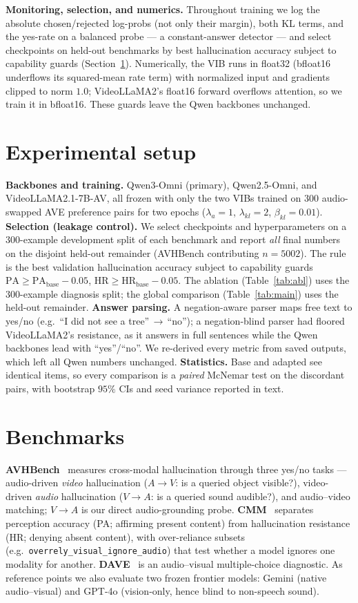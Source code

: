 \documentclass{article}
\begin{document}
\textbf{Monitoring, selection, and numerics.} Throughout training we log the absolute chosen/rejected
log-probs (not only their margin), both KL terms, and the yes-rate on a balanced probe --- a
constant-answer detector --- and select checkpoints on held-out benchmarks by best hallucination accuracy
subject to capability guards (Section~\ref{sec:setup}). Numerically, the VIB runs in float32 (bfloat16
underflows its squared-mean rate term) with normalized input and gradients clipped to norm $1.0$;
VideoLLaMA2's float16 forward overflows attention, so we train it in bfloat16. These guards leave the Qwen
backbones unchanged.

\section{Experimental setup}
\label{sec:setup}
\textbf{Backbones and training.} Qwen3-Omni (primary), Qwen2.5-Omni, and VideoLLaMA2.1-7B-AV, all frozen
with only the two VIBs trained on $300$ audio-swapped AVE preference pairs for two epochs
($\lambda_a{=}1$, $\lambda_{kl}{=}2$, $\beta_{kl}{=}0.01$). \textbf{Selection (leakage control).} We select
checkpoints and hyperparameters on a $300$-example development split of each benchmark and report \emph{all}
final numbers on the disjoint held-out remainder (AVHBench contributing $n{=}5002$). The rule is the best
validation hallucination accuracy subject to capability guards
$\text{PA}\ge\text{PA}_{\text{base}}-0.05$, $\text{HR}\ge\text{HR}_{\text{base}}-0.05$. The ablation
(Table~\ref{tab:abl}) uses the $300$-example diagnosis split; the global comparison
(Table~\ref{tab:main}) uses the held-out remainder. \textbf{Answer parsing.} A negation-aware parser maps
free text to yes/no (e.g.\ ``I did not see a tree''$\,\to\,$``no''); a negation-blind parser had floored
VideoLLaMA2's resistance, as it answers in full sentences while the Qwen backbones lead with
``yes''/``no''. We re-derived every metric from saved outputs, which left all Qwen numbers unchanged.
\textbf{Statistics.} Base and adapted see identical items, so every comparison is a \emph{paired} McNemar
test on the discordant pairs, with bootstrap $95\%$ CIs and seed variance reported in text.

\section{Benchmarks}
\label{sec:bench}
\textbf{AVHBench}~\cite{avhbench} measures cross-modal hallucination through three yes/no tasks ---
audio-driven \emph{video} hallucination ($A\!\to\!V$: is a queried object visible?), video-driven
\emph{audio} hallucination ($V\!\to\!A$: is a queried sound audible?), and audio--video matching; $V\!\to\!A$
is our direct audio-grounding probe. \textbf{CMM}~\cite{cmm} separates perception accuracy (PA; affirming
present content) from hallucination resistance (HR; denying absent content), with over-reliance subsets
(e.g.\ \texttt{overrely\_visual\_ignore\_audio}) that test whether a model ignores one modality for
another. \textbf{DAVE}~\cite{dave} is an audio--visual multiple-choice diagnostic. As reference points we
also evaluate two frozen frontier models: Gemini (native audio--visual) and GPT-4o (vision-only, hence
blind to non-speech sound).
\end{document}
